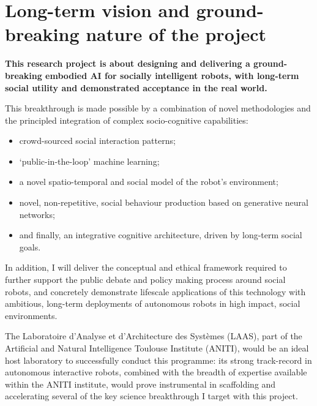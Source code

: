 

\section{Long-term vision and ground-breaking nature of the project}

\begin{framed}

\noindent\bf This research project is about designing and
delivering a ground-breaking embodied AI for socially intelligent robots, with
long-term social utility and demonstrated acceptance in the real world.

\vspace{0.4em}
\noindent This breakthrough is made possible by a combination of novel methodologies and
the principled integration of complex socio-cognitive capabilities:

\begin{itemize}
        \item crowd-sourced social interaction patterns;
        \item `public-in-the-loop' machine learning;
        \item a novel spatio-temporal and social model of the robot's environment;
        \item novel, non-repetitive, social behaviour production based on
            generative neural networks;
        \item and finally, an integrative cognitive architecture, driven by
            long-term social goals.
\end{itemize}


\vspace{0.4em}
\noindent In addition, I will deliver the conceptual and ethical framework
required to further support the public debate and policy making process
around social robots, and concretely demonstrate lifescale applications of
this technology with ambitious, long-term deployments of autonomous robots
in high impact, social environments.


\vspace{0.4em}
\noindent The Laboratoire d'Analyse et d'Architecture des Systèmes (LAAS), part
of the Artificial and Natural Intelligence Toulouse Institute (ANITI), would
be an ideal host laboratory to successfully conduct this programme: its
strong track-record in autonomous interactive robots, combined with the breadth
of expertise available within the ANITI institute, would prove instrumental in
scaffolding and accelerating several of the key science breakthrough I target
with this project.


\end{framed}

